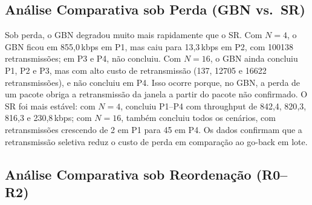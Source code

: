 \documentclass[10pt,a4paper]{article}
\begin{document}
\subsection{Análise Comparativa sob Perda (GBN vs.\ SR)}

\begin{table}[H]
\centering
\caption{Throughput (kbps) e retransmissões sob perda — GBN e SR com $N=4$ e $N=16$.}
\label{tab:loss_comp}
\end{table}

Sob perda, o GBN degradou muito mais rapidamente que o SR. Com $N=4$, o GBN
ficou em 855{,}0\,kbps em P1, mas caiu para 13{,}3\,kbps em P2, com 100138
retransmissões; em P3 e P4, não concluiu. Com $N=16$, o GBN ainda concluiu P1,
P2 e P3, mas com alto custo de retransmissão (137, 12705 e 16622
retransmissões), e não concluiu em P4. Isso ocorre porque, no GBN, a perda de um
pacote obriga a retransmissão da janela a partir do pacote não confirmado. O SR
foi mais estável: com $N=4$, concluiu P1--P4 com throughput de 842{,}4,
820{,}3, 816{,}3 e 230{,}8\,kbps; com $N=16$, também concluiu todos os cenários,
com retransmissões crescendo de 2 em P1 para 45 em P4. Os dados confirmam que a
retransmissão seletiva reduz o custo de perda em comparação ao go-back em lote.

\subsection{Análise Comparativa sob Reordenação (R0–R2)}
\end{document}
